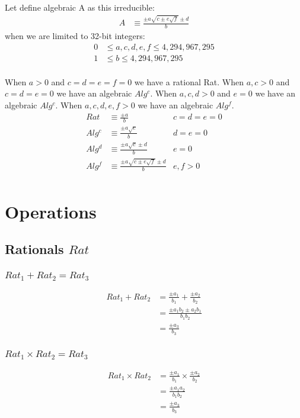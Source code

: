 \documentclass{article}
\begin{document}
Let define algebraic A as this irreducible:
\begin{align*}
A &\equiv \frac{\pm a\sqrt{c \pm e\sqrt{f}} \pm d }{b}
\end{align*}
when we are limited to 32-bit integers:
\begin{align*}
0 &\leq a, c, d, e, f \leq 4,294,967,295\\
1 &\leq b       \leq 4,294,967,295\\
\end{align*}

When $a > 0$ and $c = d = e = f = 0$ we have a rational Rat.
When $a,c > 0$ and $c = d = e = 0$ we have an algebraic $Alg^c$.
When $a,c,d > 0$  and $e = 0$ we have an algebraic $Alg^c$.
When $a,c,d,e,f > 0$ we have an algebraic $Alg^f$.
\begin{align*}
Rat   &\equiv \frac{\pm a}{b}                                & c = d = e = 0\\
Alg^c &\equiv \frac{\pm a\sqrt{c}}{b}                        & d = e = 0\\
Alg^d &\equiv \frac{\pm a\sqrt{c} \pm d}{b}                 & e = 0\\
Alg^f &\equiv \frac{\pm a\sqrt{c \pm e\sqrt{f}} \pm d }{b} & e,f > 0\\
\end{align*}

\section{Operations}
\subsection{Rationals $Rat$}

\subsubsection{$Rat_1 + Rat_2 = Rat_3$}
\begin{align*}
Rat_1 + Rat_2 &= \frac{\pm a_1}{b_1} + \frac{\pm a_2}{b_2} \\
 &= \frac{\pm a_1b_2 \pm a_2b_1 }{b_1b_2} \\
 &= \frac{\pm a_3}{b_3}
\end{align*}

\subsubsection{$Rat_1 \times Rat_2 = Rat_3$}
\begin{align*}
Rat_1 \times Rat_2 &= \frac{\pm a_1}{b_1} \times \frac{\pm a_2}{b_2} \\
  &= \frac{\pm a_1a_2}{b_1b_2} \\
  &= \frac{\pm a_3}{b_3}
\end{align*}
\end{document}
